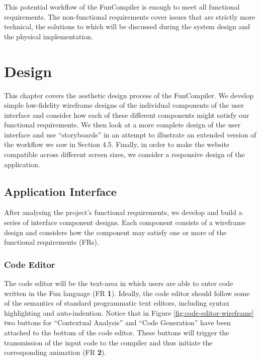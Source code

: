\documentclass{l4proj}
\begin{document}
This potential workflow of the FunCompiler is enough to meet all functional requirements. The non-functional requirements cover issues that are strictly more technical, the solutions to which will be discussed during the system design and the physical implementation.

\chapter{Design}
This chapter covers the aesthetic design process of the FunCompiler. We develop simple low-fidelity wireframe designs of the individual components of the user interface and consider how each of these different components might satisfy our functional requirements. We then look at a more complete design of the user interface and use ``storyboards'' in an attempt to illustrate an extended version of the workflow we saw in Section 4.5. Finally, in order to make the website compatible across different screen sizes, we consider a responsive design of the application.

\section{Application Interface}
After analysing the project's functional requirements, we develop and build a series of interface component designs. Each component consists of a wireframe design and considers how the component may satisfy one or more of the functional requirements (FRs).

\subsection{Code Editor}
The code editor will be the text-area in which users are able to enter code written in the Fun language (FR \textbf{1}). Ideally, the code editor should follow some of the semantics of standard programmatic text editors, including syntax highlighting and auto-indention. Notice that in Figure \ref{fig:code-editor-wireframe} two buttons for ``Contextual Analysis'' and ``Code Generation'' have been attached to the bottom of the code editor. These buttons will trigger the transmission of the input code to the compiler and thus initiate the corresponding animation (FR \textbf{2}).
\end{document}
